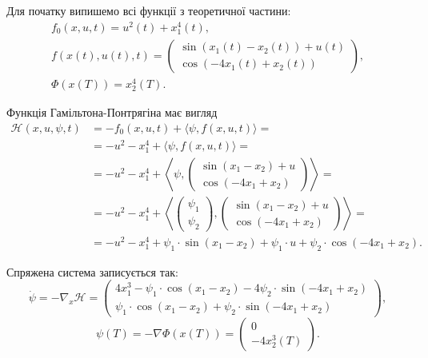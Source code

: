 \begin{solution}
    Для початку випишемо всі функції з теоретичної частини:
    \begin{multline}
        f_0(x, u, t) = u^2(t) + x_1^4(t), \\ f(x(t), u(t), t) = \begin{pmatrix} \sin(x_1(t) - x_2(t)) + u(t) \\ \cos(-4x_1(t) + x_2(t)) \end{pmatrix}, \\ \Phi(x(T)) = x_2^4(T).
    \end{multline}

    Функція Гамільтона-Понтрягіна має вигляд
    \begin{equation}
        \begin{aligned}
        \mathcal{H} (x, u, \psi, t) &= - f_0(x, u, t) + \langle \psi, f(x, u, t) \rangle = \\
        &= - u^2 - x_1^4 + \langle \psi, f(x, u, t) \rangle = \\
        &= - u^2 - x_1^4 + \left\langle \psi, \begin{pmatrix} \sin(x_1 - x_2) + u \\ \cos(-4x_1 + x_2) \end{pmatrix} \right\rangle = \\
        &= - u^2 - x_1^4 + \left\langle \begin{pmatrix} \psi_1 \\ \psi_2 \end{pmatrix}, \begin{pmatrix} \sin(x_1 - x_2) + u \\ \cos(-4x_1 + x_2) \end{pmatrix} \right\rangle = \\
        &= - u^2 - x_1^4 + \psi_1 \cdot \sin(x_1 - x_2) + \psi_1 \cdot u + \psi_2 \cdot \cos(-4x_1 + x_2).
        \end{aligned}
    \end{equation}
    
    Спряжена система записується так:
    \begin{equation} 
        \dot \psi = - \nabla_x \mathcal{H} = \begin{pmatrix} 4 x_1^3 - \psi_1 \cdot \cos(x_1 - x_2) - 4 \psi_2 \cdot \sin(-4x_1 + x_2) \\ \psi_1 \cdot \cos(x_1 - x_2) + \psi_2 \cdot \sin(-4x_1 + x_2) \end{pmatrix},
    \end{equation}
    \begin{equation} 
        \psi(T) = - \nabla \Phi(x(T)) = \begin{pmatrix} 0 \\ - 4 x_2^3(T) \end{pmatrix}.
    \end{equation}
    

\end{solution}

